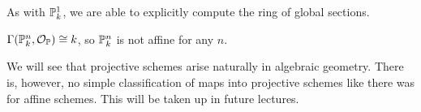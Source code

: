 As with $\P_k^1$, we are able to explicitly compute the ring of global sections.
\begin{proposition}
$\Gamma(\P_k^n, \mathcal{O}_\P) \cong k$, so $\P_k^n$ is not affine for any $n$.
\end{proposition}

We will see that projective schemes arise naturally in algebraic geometry. There is, however, no simple classification of maps into projective schemes like there was for affine schemes. This will be taken up in future lectures.
